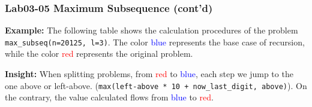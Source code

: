 \documentclass[aspectratio=169]{beamer}
\begin{document}
\begin{frame}[fragile]
\frametitle{{Lab03-05 Maximum Subsequence (cont'd)}}
 
 \vspace{-4mm}
 
    \textbf{Example:} The following table shows the calculation procedures of the problem \texttt{max\_subseq(n=20125, l=3)}. The color \textcolor{blue}{blue} represents the base case of recursion, while the color \textcolor{red}{red} represents the original problem.
    
    \textbf{Insight:} When splitting problems, from \textcolor{red}{red} to \textcolor{blue}{blue}, each step we jump to the one above or left-above. (\texttt{max(left-above * 10 + now\_last\_digit, above)}). On the contrary, the value calculated flows from \textcolor{blue}{blue} to \textcolor{red}{red}.
    

\end{frame}
\end{document}
